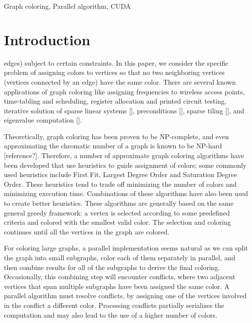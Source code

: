 \documentclass[preprint]{sigplanconf}
\begin{document}
\keywords
Graph coloring, Parallel algorithm, CUDA

\section{Introduction}

edges) subject to certain constraints. In this paper, we consider the specific problem of assigning colors to vertices so that no two neighboring vertices (vertices connected by an edge) have the same color.  There are several known applications of graph coloring like assigning frequencies to wireless access points, time-tabling and scheduling, register allocation and printed circuit testing, iterative solution of sparse linear systems [], preconditions [], sparse tiling [], and eigenvalue computation [].  

Theoretically,  graph coloring has been proven to be NP-complete, and even approximating the chromatic number of a graph is known to be NP-hard [reference?]. Therefore, a number of approximate graph coloring algorithms have been developed that use heuristics to guide assignment of colors; some commonly used heuristics include First Fit, Largest Degree Order and Saturation Degree Order.  These heuristics tend to trade off minimizing the number of colors and minimizing execution time.  Combinations of these algorithms have also been used to create better heuristics. These algorithms are generally based on the same general greedy framework: a vertex is selected according to some predefined criteria and colored with the smallest valid color. The selection and coloring continues until all the vertices in the graph are colored.

For coloring large graphs, a parallel implementation seems natural as we can split the graph into small subgraphs, color each of them separately in parallel, and then combine results for all of the subgraphs to derive the final coloring.   Occasionally, this combining step will encounter conflicts, where two adjacent vertices that span multiple subgraphs have been assigned the same color.  A parallel algorithm must resolve conflicts, by assigning one of the vertices involved in the conflict a different color.    Processing conflicts partially serializes the computation and may also lead to the use of a higher number of colors.
\end{document}
